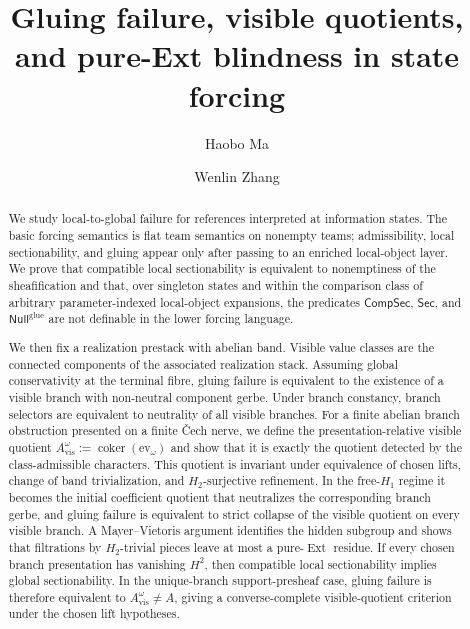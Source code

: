 \documentclass[reqno]{amsart}
\title[Gluing failure and visible quotients]{Gluing failure, visible quotients, and pure-Ext blindness in state forcing}
\author{Haobo Ma}
\author{Wenlin Zhang}
\theoremstyle{definition}
\theoremstyle{remark}
\newcommand{\CompSec}{\mathsf{CompSec}}
\newcommand{\Sec}{\mathsf{Sec}}
\newcommand{\Null}{\mathsf{Null}}
\begin{document}
\begin{abstract}
We study local-to-global failure for references interpreted at information states. The basic forcing semantics is flat team semantics on nonempty teams; admissibility, local sectionability, and gluing appear only after passing to an enriched local-object layer. We prove that compatible local sectionability is equivalent to nonemptiness of the sheafification and that, over singleton states and within the comparison class of arbitrary parameter-indexed local-object expansions, the predicates $\CompSec$, $\Sec$, and $\Null^{\mathrm{glue}}$ are not definable in the lower forcing language.

We then fix a realization prestack with abelian band. Visible value classes are the connected components of the associated realization stack. Assuming global conservativity at the terminal fibre, gluing failure is equivalent to the existence of a visible branch with non-neutral component gerbe. Under branch constancy, branch selectors are equivalent to neutrality of all visible branches. For a finite abelian branch obstruction presented on a finite \v{C}ech nerve, we define the presentation-relative visible quotient $A_{\mathrm{vis}}^{\omega}:=\operatorname{coker}(\mathrm{ev}_{\omega})$ and show that it is exactly the quotient detected by the class-admissible characters. This quotient is invariant under equivalence of chosen lifts, change of band trivialization, and $H_2$-surjective refinement. In the free-$H_1$ regime it becomes the initial coefficient quotient that neutralizes the corresponding branch gerbe, and gluing failure is equivalent to strict collapse of the visible quotient on every visible branch. A Mayer--Vietoris argument identifies the hidden subgroup and shows that filtrations by $H_2$-trivial pieces leave at most a pure-$\operatorname{Ext}$ residue. If every chosen branch presentation has vanishing $H^2$, then compatible local sectionability implies global sectionability. In the unique-branch support-presheaf case, gluing failure is therefore equivalent to $A_{\mathrm{vis}}^{\omega}\neq A$, giving a converse-complete visible-quotient criterion under the chosen lift hypotheses.
\end{abstract}


\maketitle












\end{document}
